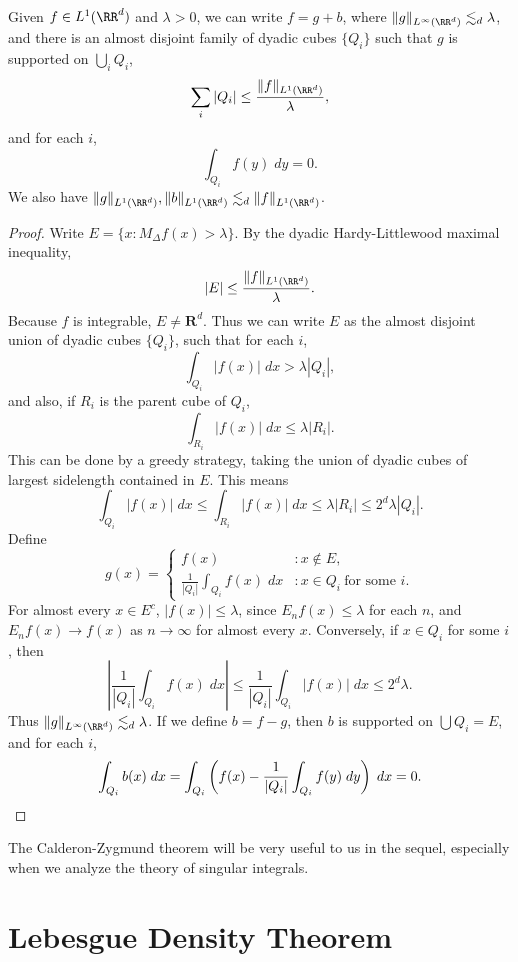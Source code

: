 \begin{theorem}
  Given $f \in L^1(\RR^d)$ and $\lambda > 0$, we can write $f = g + b$, where $\| g \|_{L^\infty(\RR^d)} \lesssim_d \lambda$, and there is an almost disjoint family of dyadic cubes $\{ Q_i \}$ such that $g$ is supported on $\bigcup_i Q_i$,
  \[ \sum_i |Q_i| \leq \frac{\| f \|_{L^1(\RR^d)}}{\lambda}, \]
  and for each $i$,
  \[ \int_{Q_i} f(y)\; dy = 0. \]
  We also have $\| g \|_{L^1(\RR^d)}, \| b \|_{L^1(\RR^d)} \lesssim_d \| f \|_{L^1(\RR^d)}$.
\end{theorem}
\begin{proof}
  Write $E = \{ x: M_\Delta f(x) > \lambda \}$. By the dyadic Hardy-Littlewood maximal inequality,
  \[ |E| \leq \frac{\| f \|_{L^1(\RR^d)}}{\lambda}. \]
  Because $f$ is integrable, $E \neq \mathbf{R}^d$. Thus we can write $E$ as the almost disjoint union of dyadic cubes $\{ Q_i \}$, such that for each $i$,
  \[ \int_{Q_i} |f(x)|\; dx > \lambda |Q_i|, \]
  and also, if $R_i$ is the parent cube of $Q_i$,
  \[ \int_{R_i} |f(x)|\; dx \leq \lambda |R_i|. \]
  This can be done by a greedy strategy, taking the union of dyadic cubes of largest sidelength contained in $E$. This means
  \[ \int_{Q_i} |f(x)|\; dx \leq \int_{R_i} |f(x)|\; dx \leq \lambda |R_i| \leq 2^d \lambda |Q_i|. \]
  Define
  \[ g(x) = \begin{cases} f(x) &: x \not \in E, \\ \frac{1}{|Q_i|} \int_{Q_i} f(x)\; dx &: x \in Q_i\ \text{for some $i$}. \end{cases} \]
  For almost every $x \in E^c$, $|f(x)| \leq \lambda$, since $E_n f(x) \leq \lambda$ for each $n$, and $E_n f(x) \to f(x)$ as $n \to \infty$ for almost every $x$. Conversely, if $x \in Q_i$ for some $i$, then
  \[ \left| \frac{1}{|Q_i|} \int_{Q_i} f(x)\; dx \right| \leq \frac{1}{|Q_i|} \int_{Q_i} |f(x)|\; dx \leq 2^d \lambda. \]
  Thus $\| g \|_{L^\infty(\RR^d)} \lesssim_d \lambda$. If we define $b = f - g$, then $b$ is supported on $\bigcup Q_i = E$, and for each $i$,
  \[ \int_{Q_i} b(x)\; dx = \int_{Q_i} \left( f(x) - \frac{1}{|Q_i|} \int_{Q_i} f(y)\; dy \right)\; dx = 0. \qedhere \]
\end{proof}

The Calderon-Zygmund theorem will be very useful to us in the sequel, especially when we analyze the theory of singular integrals.

\section{Lebesgue Density Theorem}


